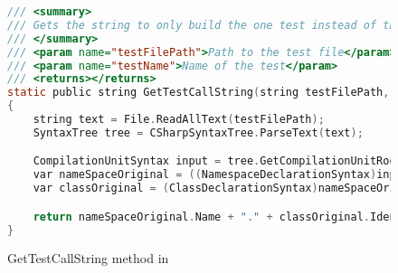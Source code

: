 
\label{GetTestCallString Method}

\begin{figure}
\begin{lstlisting}[language=C]
/// <summary>
/// Gets the string to only build the one test instead of the entire project.
/// </summary>
/// <param name="testFilePath">Path to the test file</param>
/// <param name="testName">Name of the test</param>
/// <returns></returns>
static public string GetTestCallString(string testFilePath, string testName)
{
	string text = File.ReadAllText(testFilePath);
	SyntaxTree tree = CSharpSyntaxTree.ParseText(text);

	CompilationUnitSyntax input = tree.GetCompilationUnitRoot();
	var nameSpaceOriginal = ((NamespaceDeclarationSyntax)input.Members[0]);
	var classOriginal = (ClassDeclarationSyntax)nameSpaceOriginal.Members[0];

	return nameSpaceOriginal.Name + "." + classOriginal.Identifier + "." + testName;
}
\end{lstlisting}
\caption{GetTestCallString method in \mytool}
\label{fig:GetTestCallString1}
\end{figure}
